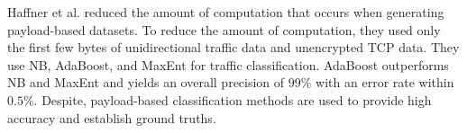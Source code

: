 Haffner et al. \cite{Haffner2005ACASAC} reduced the amount of computation that occurs when generating payload-based datasets.
To reduce the amount of computation, they used only the first few bytes of unidirectional traffic data and unencrypted TCP data.
They use NB, AdaBoost, and MaxEnt for traffic classification.
AdaBoost outperforms NB and MaxEnt and yields an overall precision of $99\%$ with an error rate within $0.5\%$.
Despite, payload-based classification methods are used to provide high accuracy and establish ground truths.